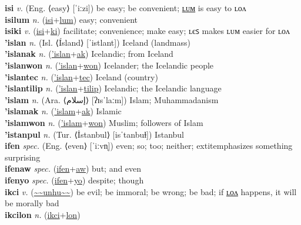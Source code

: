 \textbf{isi} \textit{v.} (Eng. ⟨easy⟩ [ˈiːzi])
be easy; be convenient; \hyperref[isilum]{ʟᴜᴍ} is easy to ʟᴏᴧ \label{isi} \\
\textbf{isilum} \textit{n.} (\hyperref[isi]{isi}+\hyperref[lum]{lum})
easy; convenient \label{isilum} \\
\textbf{isiki} \textit{v.} (\hyperref[isi]{isi}+\hyperref[ki]{ki})
facilitate; convenience; make easy; ʟєꜱ makes ʟᴜᴍ easier for ʟᴏᴧ \label{isiki} \\
\textbf{'islan} \textit{n.} (Isl. ⟨Ísland⟩ [ˈistlant])
Iceland (landmass) \label{'islan} \\
\textbf{'islanak} \textit{n.} (\hyperref['islan]{'islan}+\hyperref[ak]{ak})
Icelandic; from Iceland \label{'islanak} \\
\textbf{'islanwon} \textit{n.} (\hyperref['islan]{'islan}+\hyperref[won]{won})
Icelander; the Icelandic people \label{'islanwon} \\
\textbf{'islantec} \textit{n.} (\hyperref['islan]{'islan}+\hyperref[tec]{tec})
Iceland (country) \label{'islantec} \\
\textbf{'islantilip} \textit{n.} (\hyperref['islan]{'islan}+\hyperref[tilip]{tilip})
Icelandic; the Icelandic language \label{'islantilip} \\
\textbf{'islam} \textit{n.} (Ara. ⟨إسلام⟩ [ʔɪsˈlaːm])
Islam; Muhammadanism \label{'islam} \\
\textbf{'islamak} \textit{n.} (\hyperref['islam]{'islam}+\hyperref[ak]{ak})
Islamic \label{'islamak} \\
\textbf{'islamwon} \textit{n.} (\hyperref['islam]{'islam}+\hyperref[won]{won})
Muslim; followers of Islam \label{'islamwon} \\
\textbf{'istanpul} \textit{n.} (Tur. ⟨İstanbul⟩ [isˈtanbuɫ])
Istanbul \label{'istanpul} \\
\textbf{ifen} \textit{spec.} (Eng. ⟨even⟩ [ˈiːvn̩])
even; so; too; neither; 	extit{emphasizes something surprising} \label{ifen} \\
\textbf{ifenaw} \textit{spec.} (\hyperref[ifen]{ifen}+\hyperref[aw]{aw})
but; and even \label{ifenaw} \\
\textbf{ifenyo} \textit{spec.} (\hyperref[ifen]{ifen}+\hyperref[yo]{yo})
despite; though \label{ifenyo} \\
\textbf{ikci} \textit{v.} (\hyperref[unhu]{\~{}\~{}unhu\~{}\~{}})
be evil; be immoral; be wrong; be bad; if \hyperref[ikcilon]{ʟᴏᴧ} happens, it will be morally bad \label{ikci} \\
\textbf{ikcilon} \textit{n.} (\hyperref[ikci]{ikci}+\hyperref[lon]{lon})
